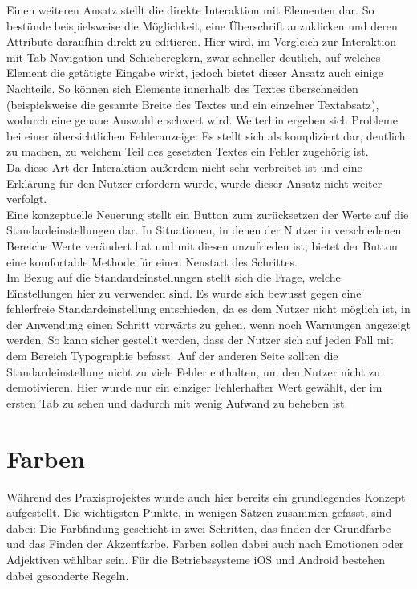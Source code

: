 Einen weiteren Ansatz stellt die direkte Interaktion mit Elementen dar. So bestünde beispielsweise die Möglichkeit, eine Überschrift anzuklicken und deren Attribute daraufhin direkt zu editieren. Hier wird, im Vergleich zur Interaktion mit Tab-Navigation und Schiebereglern, zwar schneller deutlich, auf welches Element die getätigte Eingabe wirkt, jedoch bietet dieser Ansatz auch einige Nachteile. So können sich Elemente innerhalb des Textes überschneiden (beispielsweise die gesamte Breite des Textes und ein einzelner Textabsatz), wodurch eine genaue Auswahl erschwert wird. Weiterhin ergeben sich Probleme bei einer übersichtlichen Fehleranzeige: Es stellt sich als kompliziert dar, deutlich zu machen, zu welchem Teil des gesetzten Textes ein Fehler zugehörig ist.\\
Da diese Art der Interaktion außerdem nicht sehr verbreitet ist und eine Erklärung für den Nutzer erfordern würde, wurde dieser Ansatz nicht weiter verfolgt.\\

Eine konzeptuelle Neuerung stellt ein Button zum zurücksetzen der Werte auf die Standardeinstellungen dar. In Situationen, in denen der Nutzer in verschiedenen Bereiche Werte verändert hat und mit diesen unzufrieden ist, bietet der Button eine komfortable Methode für einen Neustart des Schrittes.\\
Im Bezug auf die Standardeinstellungen stellt sich die Frage, welche Einstellungen hier zu verwenden sind. Es wurde sich bewusst gegen eine fehlerfreie Standardeinstellung entschieden, da es dem Nutzer nicht möglich ist, in der Anwendung einen Schritt vorwärts zu gehen, wenn noch Warnungen angezeigt werden. So kann sicher gestellt werden, dass der Nutzer sich auf jeden Fall mit dem Bereich Typographie befasst.
Auf der anderen Seite sollten die Standardeinstellung nicht zu viele Fehler enthalten, um den Nutzer nicht zu demotivieren. Hier wurde nur ein einziger Fehlerhafter Wert gewählt, der im ersten Tab zu sehen und dadurch mit wenig Aufwand zu beheben ist.\\

\section{Farben}
Während des Praxisprojektes wurde auch hier bereits ein grundlegendes Konzept aufgestellt. Die wichtigsten Punkte, in wenigen Sätzen zusammen gefasst, sind dabei:
Die Farbfindung geschieht in zwei Schritten, das finden der Grundfarbe und das Finden der Akzentfarbe. Farben sollen dabei auch nach Emotionen oder Adjektiven wählbar sein. Für die Betriebssysteme iOS und Android bestehen dabei gesonderte Regeln. \cite{PoplawskiPP}

